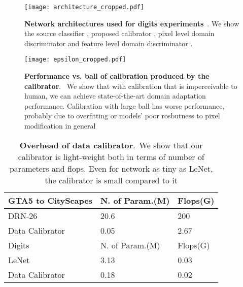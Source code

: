 





\begin{figure*}[!htp]
\centering
\texttt{[image: architecture\_cropped.pdf]}
\caption{\textbf{Network architectures used for digits experiments}~. We show the source classifier , proposed calibrator , pixel level domain discriminator  and feature level domain discriminator .
}
\label{fig:architecture}
\end{figure*}


\begin{figure*}[!htp]
\centering
\texttt{[image: epsilon\_cropped.pdf]}
\caption{\textbf{Performance vs.  ball of calibration produced by the calibrator}.~ We show that with calibration that is imperceivable to human, we can achieve state-of-the-art domain adaptation performance. Calibration with large   ball has worse performance, probably due to overfitting or models' poor rosbutness to pixel modification in general
}
\label{fig:epsilon}
\end{figure*}



\begin{table*}[!htp]
\centering
\begin{tabular}{lll}
\hline
GTA5 to CityScapes & N. of Param.(M) & Flops(G) \\ \hline
DRN-26 & 20.6 & 200 \\
Data Calibrator & 0.05 & 2.67 \\ \hline
Digits & N. of Param.(M) & Flops(G) \\ \hline
LeNet & 3.13 & 0.03 \\
Data Calibrator & 0.18 & 0.02 \\ \hline
\end{tabular}
\caption{\textbf{Overhead of data calibrator}.~We show that our calibrator is light-weight both in terms of number of parameters and flops. Even for network as tiny as LeNet, the calibrator is small compared to it}
\label{table:overhead}
\end{table*}









%
